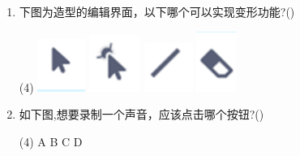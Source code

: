 \documentclass[10.5pt, a4paper]{article}
\begin{document}
\begin{enumerate}
        \item 下图为造型的编辑界面，以下哪个可以实现变形功能?(\qquad)
        \begin{tasks}(4)
            \task \includegraphics[width=.04\textwidth]{14a.png}
            \task \includegraphics[width=.04\textwidth]{14b.png}
            \task \includegraphics[width=.04\textwidth]{14c.png}
            \task \includegraphics[width=.04\textwidth]{14d.png}
        \end{tasks}
        
        \item 如下图,想要录制一个声音，应该点击哪个按钮?(\qquad)
        \begin{tasks}(4)
            \task A
            \task B
            \task C
            \task D
        \end{tasks}


\end{enumerate}
\end{document}
